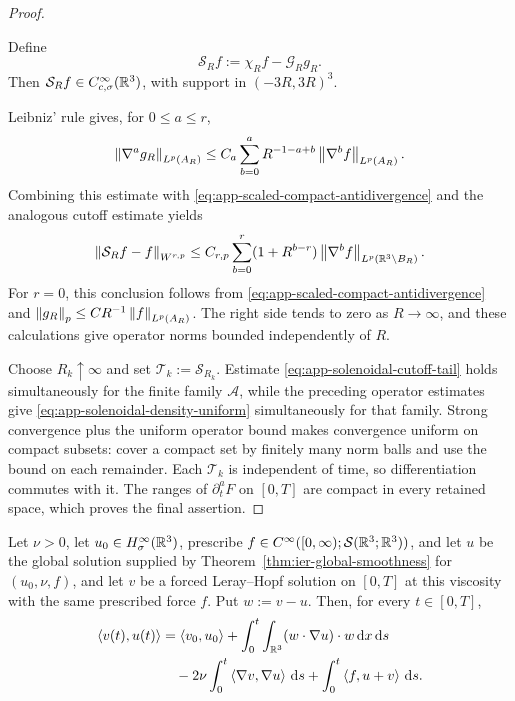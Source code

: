 \begin{proof}
\begin{samepage}
Define
\[
 \mathcal S_Rf:=\chi_Rf-\mathcal G_Rg_R.
\]
Then \(\mathcal S_Rf\in C_{c,\sigma}^\infty(\mathbb R^3)\), with support in
\((-3R,3R)^3\).
\end{samepage}
Leibniz' rule gives, for \(0\le a\le r\),
\[
 \left\lVert \nabla^ag_R\right\rVert_{L^p(A_R)}
 \le C_a\sum_{b=0}^{a}
 R^{-1-a+b}\left\lVert \nabla^bf\right\rVert_{L^p(A_R)}.
\]
Combining this estimate with
\eqref{eq:app-scaled-compact-antidivergence} and the analogous cutoff
estimate yields
\begin{equation}
 \left\lVert \mathcal S_Rf-f\right\rVert_{W^{r,p}}
 \le C_{r,p}\sum_{b=0}^{r}
 (1+R^{b-r})\left\lVert \nabla^bf\right\rVert_{L^p(\mathbb R^3\setminus B_R)}.
 \label{eq:app-solenoidal-cutoff-tail}
\end{equation}
For \(r=0\), this conclusion follows from
\eqref{eq:app-scaled-compact-antidivergence} and
\(\left\lVert g_R\right\rVert_p\le C R^{-1}\left\lVert f\right\rVert_{L^p(A_R)}\).
The right side tends to zero as \(R\to\infty\), and these calculations
give operator norms bounded independently of \(R\).

Choose \(R_k\uparrow\infty\) and set
\(\mathcal T_k:=\mathcal S_{R_k}\).  Estimate
\eqref{eq:app-solenoidal-cutoff-tail} holds simultaneously for the finite
family \(\mathscr A\), while the preceding operator estimates give
\eqref{eq:app-solenoidal-density-uniform} simultaneously for that family.
Strong convergence plus the uniform operator bound makes convergence
uniform on compact subsets: cover a compact set by finitely many norm balls
and use the bound on each remainder.  Each \(\mathcal T_k\) is independent
of time, so differentiation commutes with it.  The ranges of
\(\partial_t^aF\) on \([0,T]\) are compact in every retained space, which
proves the final assertion.
\end{proof}

\begin{lemma}
\label{lem:app-cross-energy}
Let \(\nu>0\), let \(u_0\in H^\infty_\sigma(\mathbb R^3)\), prescribe
\(f\in C^\infty([0,\infty);\mathcal S(\mathbb R^3;\mathbb R^3))\), and let \(u\) be the
global solution supplied by
Theorem~\ref{thm:ier-global-smoothness} for \((u_0,\nu,f)\), and let \(v\)
be a forced Leray--Hopf solution on \([0,T]\) at this viscosity with the
same prescribed force \(f\).  Put \(w:=v-u\).  Then, for every
\(t\in[0,T]\),
\begin{align}
 \left\langle v(t),u(t)\right\rangle
 &=
 \left\langle v_0,u_0\right\rangle
 +\int_0^t\int_{\mathbb R^3}
       (w\cdot\nabla u)\cdot w\,\mathrm d x\,\mathrm d s
 \notag\\
 &\quad
 -2\nu\int_0^t\left\langle \nabla v,\nabla u\right\rangle\,\mathrm d s
 +\int_0^t\left\langle f,u+v\right\rangle\,\mathrm d s.
 \label{eq:app-cross-energy}
\end{align}
\end{lemma}

